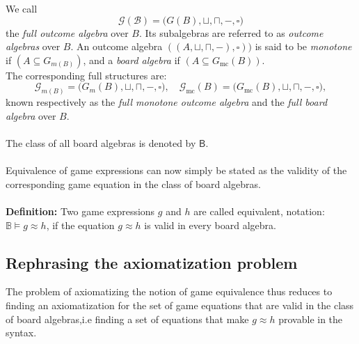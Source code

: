 \documentclass[12pt]{article}
\begin{document}
We call
\[
\mathcal{G(B)} = \big(G(B), \sqcup, \sqcap, -, \square \big)
\]
the \emph{full outcome algebra} over \( B \).  
Its subalgebras are referred to as \emph{outcome algebras} over \( B \).
An outcome algebra $( (A, \sqcup, \sqcap, -), \square) )$ is said to be \emph{monotone} if $( A \subseteq G_{m(B)} )$, and a \emph{board algebra} if $( A \subseteq G_{\mathrm{mc}}(B) )$.\\
The corresponding full structures are:
\[
\mathcal{G}_{m(B)} = \big(G_m(B), \sqcup, \sqcap, -, \square\big), \quad
\mathcal{G}_{\mathrm{mc}}(B) = \big(G_{\mathrm{mc}}(B), \sqcup, \sqcap, -, \square\big),
\]
known respectively as the \emph{full monotone outcome algebra} and the \emph{full board algebra} over \( B \). \\ \\
The class of all board algebras is denoted by \( \mathsf{B} \).\\ \\
Equivalence of game expressions can now simply be stated as the validity of the corresponding game equation in the class of board algebras. \\ \\
\textbf{Definition:} Two game expressions $g$ and $h$ are called equivalent, notation: $\mathbb{B}\vDash g \approx h$, if the equation $g \approx h$ is valid in every board algebra.  
\subsection{Rephrasing the axiomatization problem}
The problem of axiomatizing the notion of game equivalence thus reduces to finding an axiomatization for the set of game equations that are valid in the class of board algebras,i.e finding a set of equations that make $g \approx h$ provable in the syntax. 
\end{document}
